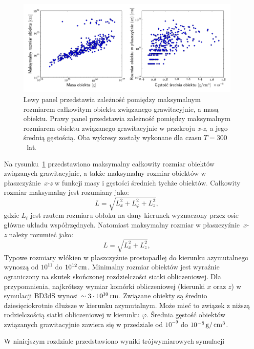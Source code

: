\begin{figure}[ht]
   \centering
   \includegraphics[width=0.95\linewidth]{figures/fig_mass_size}
   \caption{Lewy panel przedstawia zależność pomiędzy maksymalnym rozmiarem
      całkowitym obiektu związanego grawitacyjnie, a masą obiektu. Prawy panel
      przedstawia zależność pomiędzy maksymalnym rozmiarem obiektu związanego
      grawitacyjnie w przekroju \emph{x-z}, a jego średnią gęstością.  Oba
      wykresy zostały wykonane dla czasu $T=300$~lat. }
   \label{fig:mass_size}
\end{figure}
%
\par Na rysunku~\ref{fig:mass_size} przedstawiono maksymalny całkowity rozmiar
obiektów związanych grawitacyjnie, a także maksymalny rozmiar obiektów w
płaszczyźnie~\emph{x-z} w funkcji masy i gęstości średnich tychże obiektów.
Całkowity rozmiar maksymalny jest rozumiany jako:
\begin{equation}
   L = \sqrt{L_x^2 + L_\varphi^2 + L_z^2},
\end{equation}
gdzie $L_i$ jest rzutem rozmiaru obłoku na dany kierunek wyznaczony przez osie
główne układu współrzędnych. Natomiast maksymalny rozmiar w
płaszczyźnie~\emph{x-z} należy rozumieć jako:
\begin{equation}
   L = \sqrt{L_x^2 + L_z^2},
\end{equation}
Typowe rozmiary włókien w płaszczyźnie prostopadłej do kierunku azymutalnego
wynoszą od $10^{11}$ do $10^{12}\hbox{$\thinspace\textrm{cm}$}$. Minimalny rozmiar obiektów jest wyraźnie
ograniczony na skutek skończonej rozdzielczości siatki obliczeniowej. Dla
przypomnienia, najkrótszy wymiar komórki obliczeniowej (kierunki $x$ oraz $z$) w
symulacji BD3dS wynosi $\sim 3\cdot10^{10}\hbox{$\thinspace\textrm{cm}$}$. Związane obiekty są średnio
dziesięciokrotnie dłuższe w kierunku azymutalnym. Może mieć to związek z niższą
rodzielczością siatki obliczeniowej w kierunku $\varphi$.  Średnia gęstość
obiektów związanych grawitacyjnie zawiera się w przedziale od $10^{-9}$ do
$10^{-8}\hbox{$\thinspace\textrm{g}$}/\hbox{$\thinspace\textrm{cm}$}^{3}$.
\par W niniejszym rozdziale przedstawiono wyniki trójwymiarowych symulacji
